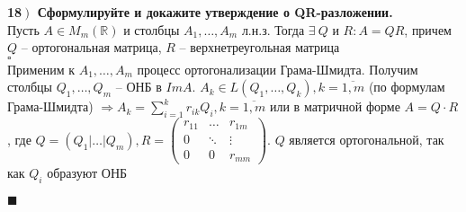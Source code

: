 \documentclass[a4paper,12pt]{article}
\begin{document}
    \textbf{18$\left.\right)$ Сформулируйте и докажите утверждение о QR-разложении.}\\
    Пусть $A\in M_m(\mathbb{R})$ и столбцы $A_1, \ldots, A_m$ л.н.з. Тогда $\exists\ Q$ и $R:A=QR$, причем $Q$ -- ортогональная матрица, $R$ -- верхнетреугольная матрица\\
    $\square$\\
    Применим к $A_1, \ldots, A_m$ процесс ортогонализации Грама-Шмидта. Получим столбцы $Q_1, \ldots, Q_m$ -- ОНБ в $ImA$. $A_k\in L(Q_1, \ldots, Q_k), k=\overline{1, m}$ (по формулам Грама-Шмидта) $\Rightarrow A_k=\sum\limits_{i=1}^k r_{ik}Q_i, k=\overline{1, m}$ или в матричной форме $A=Q\cdot R$, где $Q=(Q_1|\ldots|Q_m), R=\begin{pmatrix}
                                                                                                                                                                                                                                                                                                                                            r_{11} & \ldots & r_{1m} \\
                                                                                                                                                                                                                                                                                                                                            0      & \ddots & \vdots \\
                                                                                                                                                                                                                                                                                                                                            0      & 0      & r_{mm}
    \end{pmatrix}$. $Q$ является ортогональной, так как $Q_i$ образуют ОНБ
    \begin{flushright}
        $\blacksquare$
    \end{flushright}
\end{document}
